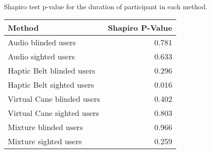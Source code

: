 
\centering
\caption{Shapiro test p-value for the duration of participant in each method.}
\label{tab:shapiro_duration}
\begin{tabular}{lr}
\toprule
                    Method &  Shapiro P-Value \\
\midrule
       Audio blinded users &            0.781 \\
       Audio sighted users &            0.633 \\
 Haptic Belt blinded users &            0.296 \\
 Haptic Belt sighted users &            0.016 \\
Virtual Cane blinded users &            0.402 \\
Virtual Cane sighted users &            0.803 \\
     Mixture blinded users &            0.966 \\
     Mixture sighted users &            0.259 \\
\bottomrule
\end{tabular}
